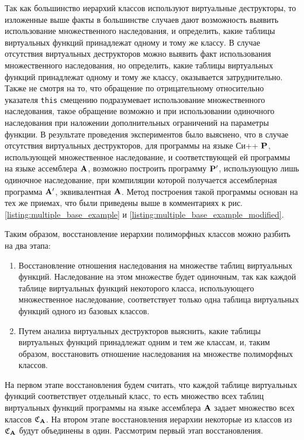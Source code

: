 Так как большинство иерархий классов используют виртуальные деструкторы, то изложенные выше факты в большинстве случаев дают возможность выявить использование множественного наследования, и определить, какие таблицы виртуальных функций принадлежат одному и тому же классу. В случае отсутствия виртуальных деструкторов можно выявить факт использования множественного наследования, но определить, какие таблицы виртуальных функций принадлежат одному и тому же классу, оказывается затруднительно. Также не смотря на то, что обращение по отрицательному относительно указателя \lstinline{this} смещению подразумевает использование множественного наследования, такое обращение возможно и при использовании одиночного наследования при наложении дополнительных ограничений на параметры функции. В результате проведения экспериментов было выяснено, что в случае отсутствия виртуальных деструкторов, для программы на языке Си++ $\mathbf{P}$, использующей множественное наследование, и соответствующей ей программы на языке ассемблера $\mathbf{A}$, возможно построить программу $\mathbf{P}'$, использующую лишь одиночное наследование, при компиляции которой получается ассемблерная программа $\mathbf{A}'$, эквивалентная $\mathbf{A}$. Метод построения такой программы основан на тех же приемах, что были приведены выше в комментариях к рис. \ref{listing:multiple_base_example} и \ref{listing:multiple_base_example_modified}.

Таким образом, восстановление иерархии полиморфных классов можно разбить на два этапа:
\begin{enumerate}
\item Восстановление отношения наследования на множестве таблиц виртуальных функций. Наследование на этом множестве будет одиночным, так как каждой таблице виртуальных функций некоторого класса, использующего множественное наследование, соответствует только одна таблица виртуальных функций одного из базовых классов.
\item Путем анализа виртуальных деструкторов выяснить, какие таблицы виртуальных функций принадлежат одним и тем же классам, и, таким образом, восстановить отношение наследования на множестве полиморфных классов.
\end{enumerate}

На первом этапе восстановления будем считать, что каждой таблице виртуальных функций соответствует отдельный класс, то есть множество всех таблиц виртуальных функций программы на языке ассемблера $\mathbf{A}$ задает множество всех классов $\mathfrak{C}_{\mathbf{A}}$. На втором этапе восстановления иерархии некоторые из классов из $\mathfrak{C}_{\mathbf{A}}$ будут объединены в один. Рассмотрим первый этап восстановления.

